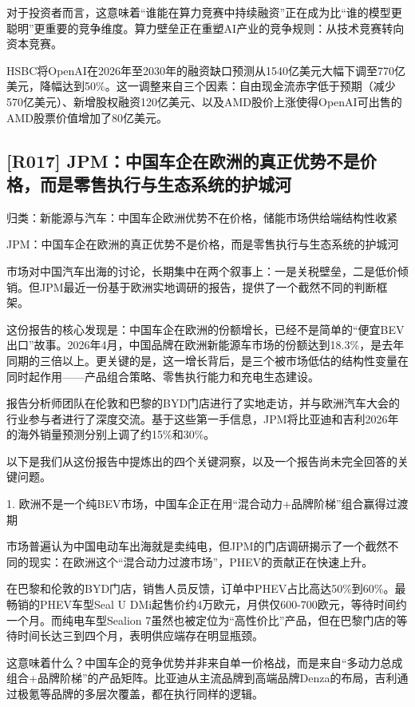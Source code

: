 \documentclass[11pt]{ctexart}
\begin{document}
对于投资者而言，这意味着“谁能在算力竞赛中持续融资”正在成为比“谁的模型更聪明”更重要的竞争维度。算力壁垒正在重塑AI产业的竞争规则：从技术竞赛转向资本竞赛。

HSBC将OpenAI在2026年至2030年的融资缺口预测从1540亿美元大幅下调至770亿美元，降幅达到50\%。这一调整来自三个因素：自由现金流赤字低于预期（减少570亿美元）、新增股权融资120亿美元、以及AMD股价上涨使得OpenAI可出售的AMD股票价值增加了80亿美元。

\subsection{[R017] JPM：中国车企在欧洲的真正优势不是价格，而是零售执行与生态系统的护城河}
{\small\color{refgray}归类：新能源与汽车：中国车企欧洲优势不在价格，储能市场供给端结构性收紧}

JPM：中国车企在欧洲的真正优势不是价格，而是零售执行与生态系统的护城河

市场对中国汽车出海的讨论，长期集中在两个叙事上：一是关税壁垒，二是低价倾销。但JPM最近一份基于欧洲实地调研的报告，提供了一个截然不同的判断框架。

这份报告的核心发现是：中国车企在欧洲的份额增长，已经不是简单的“便宜BEV出口”故事。2026年4月，中国品牌在欧洲新能源车市场的份额达到18.3\%，是去年同期的三倍以上。更关键的是，这一增长背后，是三个被市场低估的结构性变量在同时起作用——产品组合策略、零售执行能力和充电生态建设。

报告分析师团队在伦敦和巴黎的BYD门店进行了实地走访，并与欧洲汽车大会的行业参与者进行了深度交流。基于这些第一手信息，JPM将比亚迪和吉利2026年的海外销量预测分别上调了约15\%和30\%。

以下是我们从这份报告中提炼出的四个关键洞察，以及一个报告尚未完全回答的关键问题。

1. 欧洲不是一个纯BEV市场，中国车企正在用“混合动力+品牌阶梯”组合赢得过渡期

市场普遍认为中国电动车出海就是卖纯电，但JPM的门店调研揭示了一个截然不同的现实：在欧洲这个“混合动力过渡市场”，PHEV的贡献正在快速上升。

在巴黎和伦敦的BYD门店，销售人员反馈，订单中PHEV占比高达50\%到60\%。最畅销的PHEV车型Seal U DMi起售价约4万欧元，月供仅600-700欧元，等待时间约一个月。而纯电车型Sealion 7虽然也被定位为“高性价比”产品，但在巴黎门店的等待时间长达三到四个月，表明供应端存在明显瓶颈。

这意味着什么？中国车企的竞争优势并非来自单一价格战，而是来自“多动力总成组合+品牌阶梯”的产品矩阵。比亚迪从主流品牌到高端品牌Denza的布局，吉利通过极氪等品牌的多层次覆盖，都在执行同样的逻辑。
\end{document}
